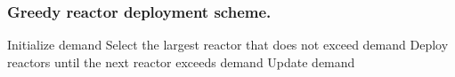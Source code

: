 \documentclass[9pt]{beamer}
\begin{document}
  \begin{frame}
    \frametitle{Greedy reactor deployment scheme.}
      \begin{algorithmic}[1]
          \State Initialize demand
              \State Select the largest reactor that does not exceed demand
              \State Deploy reactors until the next reactor exceeds demand
              \State Update demand
          \EndWhile
      \end{algorithmic}
  \end{frame}


\end{document}
